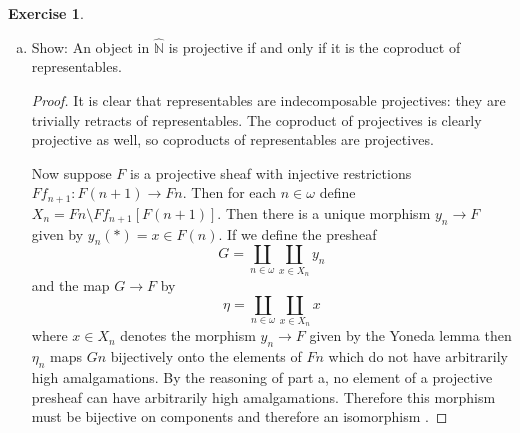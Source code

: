 \documentclass{article}
\newcommand{\N}{\mathbb{N}}
\newcommand{\psh}[1]{\widehat{#1}}
\theoremstyle{definition}
\newtheorem{question}{Exercise}
\begin{document}
\begin{question}
\begin{enumerate}[a)]
        \item Show: An object in \(\psh{\N}\) is projective if and only if it is
              the coproduct of representables.

              \begin{proof}
                  It is clear that representables are indecomposable
                  projectives: they are trivially retracts of representables.
                  The coproduct of projectives is clearly projective as well,
                  so coproducts of representables are projectives.

                  Now suppose \(F\) is a projective sheaf with injective
                  restrictions \(Ff_{n+1}:F(n+1)\to Fn\). Then for each
                  \(n\in\omega\) define \(X_{n}=Fn\setminus Ff_{n+1}[F(n+1)]\).
                  Then there is a unique morphism \(y_{n}\to F\) given by
                  \(y_{n}(*)=x\in F(n)\). If we define the presheaf
                  \[
                      G=\coprod_{n\in\omega}\coprod_{x\in X_{n}}y_{n}
                  \]
                  and the map \(G\to F\) by
                  \[
                      \eta=\coprod_{n\in\omega}\coprod_{x\in X_{n}}x
                  \]
                  where \(x\in X_{n}\) denotes the morphism \(y_{n}\to F\) given
                  by the Yoneda lemma then \(\eta_{n}\) maps \(Gn\) bijectively
                  onto the elements of \(Fn\) which do not have arbitrarily high
                  amalgamations. By the reasoning of part a, no element of a
                  projective presheaf can have arbitrarily high amalgamations.
                  Therefore this morphism must be bijective on components and
                  therefore an isomorphism .
              \end{proof}
    \end{enumerate}
\end{question}
\end{document}
